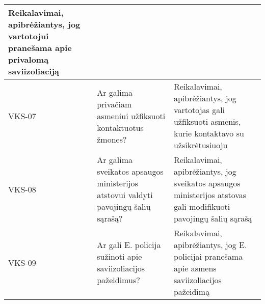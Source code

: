 \documentclass{VUMIFPSkursinis}
\begin{document}
\begin{center}
\begin{longtable}{|C{2cm}|L{5cm}|L{8cm}|}
 					Reikalavimai, apibrėžiantys, jog vartotojui pranešama apie privalomą saviizoliaciją\\ \hline   					
 					VKS-07 &
 					Ar galima privačiam asmeniui užfiksuoti kontaktuotus žmones?& 
 					Reikalavimai, apibrėžiantys, jog vartotojas gali užfiksuoti asmenis, kurie kontaktavo su užsikrėtusiuoju\\ \hline  
 					VKS-08 &
 					Ar galima sveikatos apsaugos ministerijos atstovui valdyti pavojingų šalių sąrašą?& 
 					Reikalavimai, apibrėžiantys, jog sveikatos apsaugos ministerijos atstovas gali modifikuoti pavojingų šalių sąrašą\\ \hline  
 					VKS-09 &
 					Ar gali E. policija sužinoti apie saviizoliacijos pažeidimus?& 
 					Reikalavimai, apibrėžiantys, jog E. policijai pranešama apie asmens saviizoliacijos pažeidimą\\ \hline			
				\end{longtable}
			\end{center}			
\end{document}
